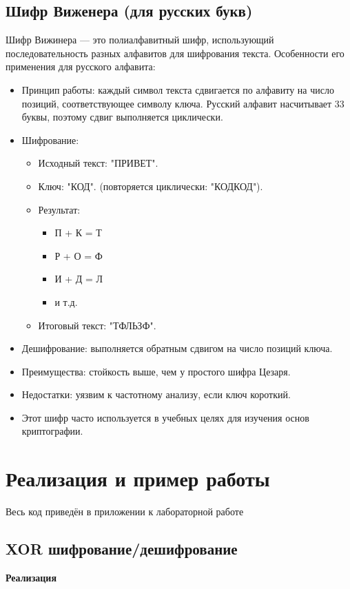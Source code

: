 \documentclass[a4paper, 12pt]{article}
\begin{document}
\subsection{Шифр Виженера (для русских букв)}
Шифр Вижинера — это полиалфавитный шифр, использующий последовательность разных алфавитов для шифрования текста. Особенности его применения для русского алфавита:

\begin{itemize}
    \item Принцип работы: каждый символ текста сдвигается по алфавиту на число позиций, соответствующее символу ключа. Русский алфавит насчитывает 33 буквы, поэтому сдвиг выполняется циклически.
    \item Шифрование:
    \begin{itemize}
        \item Исходный текст: "ПРИВЕТ".
        \item Ключ: "КОД". (повторяется циклически: "КОДКОД").
        \item Результат:
        \begin{itemize}
            \item П + К = Т
            \item Р + О = Ф
            \item И + Д = Л
            \item и т.д.
        \end{itemize}
        \item Итоговый текст: "ТФЛЬЗФ".
    \end{itemize}
    \item Дешифрование: выполняется обратным сдвигом на число позиций ключа.
    \item Преимущества: стойкость выше, чем у простого шифра Цезаря.
    \item Недостатки: уязвим к частотному анализу, если ключ короткий.
    \item Этот шифр часто используется в учебных целях для изучения основ криптографии.
\end{itemize}

\section{Реализация и пример работы}
Весь код приведён в приложении к лабораторной работе

\subsection{XOR шифрование/дешифрование}
\textbf{Реализация}
\end{document}
